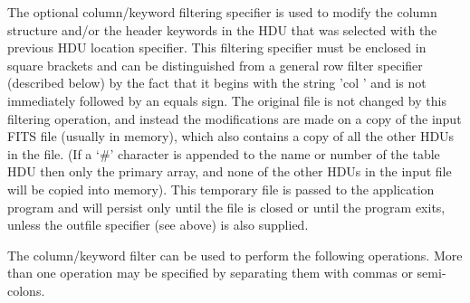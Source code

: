 \documentclass[11pt]{book}
\begin{document}
The optional column/keyword filtering specifier is used to modify the
column structure and/or the header keywords in the HDU that was
selected with the previous HDU location specifier. This filtering
specifier must be enclosed in square brackets and can be distinguished
from a general row filter specifier (described below) by the fact that
it begins with the string 'col ' and is not immediately followed by an
equals sign.  The original file is not changed by this filtering
operation, and instead the modifications are made on a copy of the
input FITS file (usually in memory), which also contains a copy of all
the other HDUs in the file.  (If a `\#' character is appended to the name
or number of the
table HDU then only the primary array, and none of the other
HDUs in the input file will be copied into memory).
This temporary file is passed to the
application program and will persist only until the file is closed or
until the program exits, unless the outfile specifier (see above) is
also supplied.

The column/keyword filter can be used to perform the following
operations.  More than one operation may be specified by separating
them with commas or semi-colons.
\end{document}
